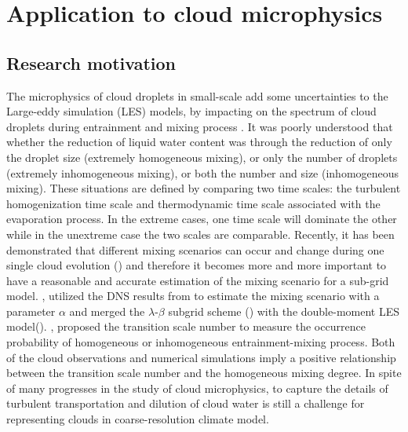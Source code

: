 \chapter{Application to cloud microphysics}

\section{Research motivation}
The microphysics of cloud droplets in small-scale add some uncertainties to the
Large-eddy simulation (LES) models, by impacting on the spectrum of cloud
droplets during entrainment and mixing process  \cite{Jarecka2013}. It was
poorly understood that whether the reduction of liquid water content was
through the reduction of only the droplet size (extremely homogeneous mixing),
or only the number of droplets (extremely inhomogeneous mixing), or both the
number and size (inhomogeneous mixing). These situations are defined by
comparing two time scales: the turbulent homogenization time scale and
thermodynamic time scale associated with the evaporation process. In the
extreme cases, one time scale will dominate the other while in the unextreme
case the two scales are comparable. Recently, it has been demonstrated that
different mixing scenarios can occur and change during one single cloud
evolution (\cite{And09,Burnet07,Lehmann09}) and therefore it becomes more and
more important to have a reasonable and accurate estimation of the mixing
scenario for a sub-grid model. \cite{Jarecka2013}, utilized the DNS results
from \cite{And04,And06,And09}  to estimate the mixing scenario with a parameter
$\alpha$ and merged the $\lambda$-$\beta$ subgrid scheme (\cite{Jarecka2009})
with the double-moment LES model(\cite{Morrison2008}). \cite{Lu2013}, proposed
the transition scale number to measure the occurrence probability of
homogeneous or inhomogeneous entrainment-mixing process. Both of the cloud
observations and numerical simulations imply a positive relationship between
the transition scale number and the homogeneous mixing degree. In spite of many
progresses in the study of cloud microphysics, to capture the details of
turbulent transportation and dilution of cloud water is still a challenge for
representing clouds in coarse-resolution climate model.

